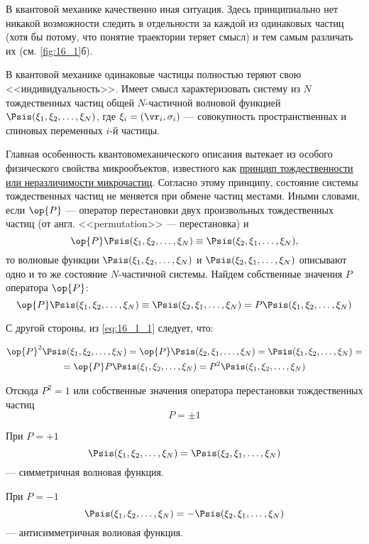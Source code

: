 В квантовой механике качественно иная ситуация. Здесь принципиально нет никакой возможности следить в отдельности за каждой из одинаковых частиц (хотя бы потому, что понятие траектории теряет смысл) и тем самым различать их (см. \autoref{fig:16_1}б).

В квантовой механике одинаковые частицы полностью теряют свою <<индивидуальность>>. Имеет смысл характеризовать систему из $N$ тождественных частиц общей $N$-частичной волновой функцией $\Psis(\xi_1, \xi_2, \dots, \xi_N )$, где $\xi_i = (\vr_i, \sigma_i)$ --- совокупность пространственных и спиновых переменных $i$-й частицы.

Главная особенность квантовомеханического описания вытекает из особого физического свойства микрообъектов, известного как \underline{принцип тождественности или неразличимости микрочастиц}. Согласно этому принципу, состояние системы тождественных частиц не меняется при обмене частиц местами. Иными словами, если $\op{P}$ --- оператор перестановки двух произвольных тождественных частиц (от англ. <<permutation>> --- перестановка) и
$$
\op{P} \Psis(\xi_1, \xi_2, \dots, \xi_N) \equiv \Psis(\xi_2, \xi_1, \dots, \xi_N),
$$
то волновые функции $\Psis(\xi_1, \xi_2, \dots, \xi_N)$ и $\Psis(\xi_2, \xi_1, \dots, \xi_N)$ описывают одно и то же состояние $N$-частичной системы. Найдем собственные значения $P$ оператора $\op{P}$:
\begin{equation}
\label{eq:16_1_1}
\op{P} \Psis(\xi_1, \xi_2, \dots, \xi_N) \equiv \Psis(\xi_2, \xi_1, \dots, \xi_N) = P \Psis(\xi_1, \xi_2, \dots, \xi_N)
\end{equation}

С другой стороны, из \eqref{eq:16_1_1} следует, что:

\begin{gather*}
\op{P}^2 \Psis(\xi_1, \xi_2, \dots, \xi_N) = \op{P}\Psis(\xi_2, \xi_1, \dots, \xi_N) = \Psis(\xi_1, \xi_2, \dots, \xi_N) = \\= \op{P} P\Psis(\xi_1, \xi_2, \dots, \xi_N) = P^2 \Psis(\xi_1, \xi_2, \dots, \xi_N)
\end{gather*}

Отсюда $P^2 = 1$ или собственные значения оператора перестановки тождественных частиц 
$$\boxed{P = \pm 1}$$

При $P = +1$
$$
\Psis(\xi_1, \xi_2, \dots, \xi_N) = \Psis(\xi_2, \xi_1, \dots, \xi_N)
$$
--- симметричная волновая функция.

При $P = -1$
$$
\Psis(\xi_1, \xi_2, \dots, \xi_N) = -\Psis(\xi_2, \xi_1, \dots, \xi_N)
$$ 
--- антисимметричная волновая функция.

